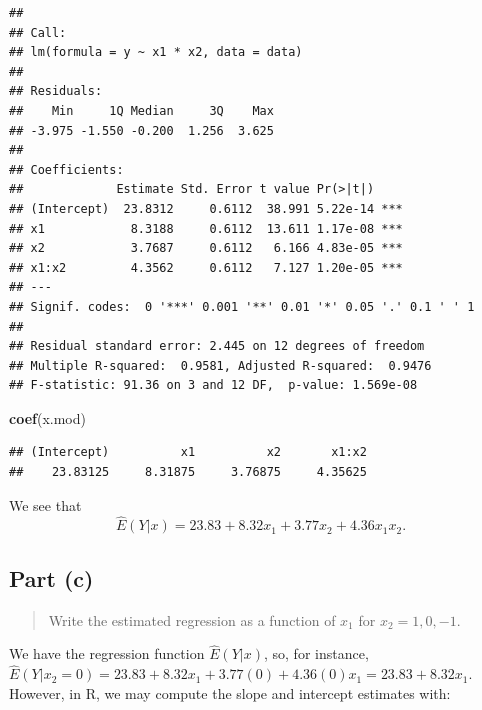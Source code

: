 \documentclass[
]{article}
\newenvironment{Shaded}{\begin{snugshade}}{\end{snugshade}}
\newcommand{\FunctionTok}[1]{\textcolor[rgb]{0.13,0.29,0.53}{\textbf{#1}}}
\newcommand{\NormalTok}[1]{#1}
\begin{document}
\begin{verbatim}
## 
## Call:
## lm(formula = y ~ x1 * x2, data = data)
## 
## Residuals:
##    Min     1Q Median     3Q    Max 
## -3.975 -1.550 -0.200  1.256  3.625 
## 
## Coefficients:
##             Estimate Std. Error t value Pr(>|t|)    
## (Intercept)  23.8312     0.6112  38.991 5.22e-14 ***
## x1            8.3188     0.6112  13.611 1.17e-08 ***
## x2            3.7687     0.6112   6.166 4.83e-05 ***
## x1:x2         4.3562     0.6112   7.127 1.20e-05 ***
## ---
## Signif. codes:  0 '***' 0.001 '**' 0.01 '*' 0.05 '.' 0.1 ' ' 1
## 
## Residual standard error: 2.445 on 12 degrees of freedom
## Multiple R-squared:  0.9581, Adjusted R-squared:  0.9476 
## F-statistic: 91.36 on 3 and 12 DF,  p-value: 1.569e-08
\end{verbatim}

\begin{Shaded}
\begin{Highlighting}[]
\FunctionTok{coef}\NormalTok{(x.mod)}
\end{Highlighting}
\end{Shaded}

\begin{verbatim}
## (Intercept)          x1          x2       x1:x2 
##    23.83125     8.31875     3.76875     4.35625
\end{verbatim}

We see that \[
  \hat{E}(Y|x) = 23.83 + 8.32 x_1 + 3.77 x_2 + 4.36 x_1 x_2.
\]

\hypertarget{part-c}{%
\subsection{Part (c)}\label{part-c}}

\begin{quote}
Write the estimated regression as a function of \(x_1\) for
\(x_2 = 1,0,-1\).
\end{quote}

We have the regression function \(\hat{E}(Y|x)\), so, for instance,
\(\hat{E}(Y|x_2=0) = 23.83 + 8.32 x_1 + 3.77 (0) + 4.36 (0) x_1 = 23.83+8.32 x_1\).
However, in R, we may compute the slope and intercept estimates with:
\end{document}
